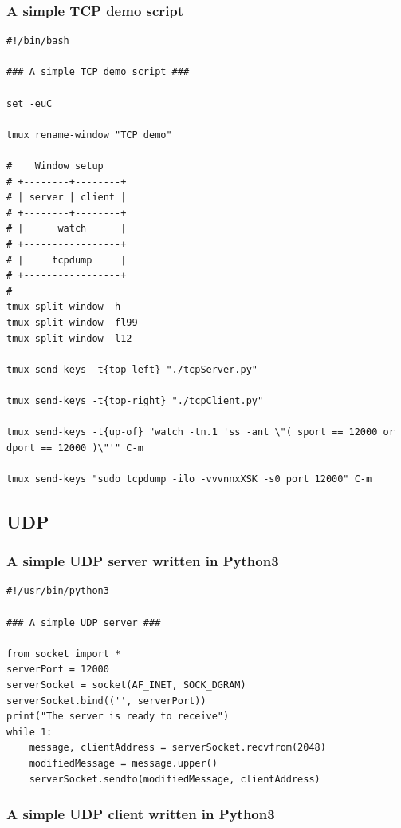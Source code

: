 \documentclass{article}
\begin{document}
\subsubsection{A simple TCP demo script}
\label{sec:orgdf1e2a5}

\begin{verbatim}
#!/bin/bash

### A simple TCP demo script ###

set -euC

tmux rename-window "TCP demo"

#    Window setup
# +--------+--------+
# | server | client |
# +--------+--------+
# |      watch      |
# +-----------------+
# |     tcpdump     |
# +-----------------+
#
tmux split-window -h
tmux split-window -fl99
tmux split-window -l12

tmux send-keys -t{top-left} "./tcpServer.py" 

tmux send-keys -t{top-right} "./tcpClient.py"

tmux send-keys -t{up-of} "watch -tn.1 'ss -ant \"( sport == 12000 or dport == 12000 )\"'" C-m

tmux send-keys "sudo tcpdump -ilo -vvvnnxXSK -s0 port 12000" C-m
\end{verbatim}
\subsection{UDP}
\label{sec:orga5eac96}

\subsubsection{A simple UDP server written in Python3}
\label{sec:org02299d9}

\begin{verbatim}
#!/usr/bin/python3

### A simple UDP server ###

from socket import *
serverPort = 12000
serverSocket = socket(AF_INET, SOCK_DGRAM)
serverSocket.bind(('', serverPort))
print("The server is ready to receive")
while 1:
    message, clientAddress = serverSocket.recvfrom(2048)
    modifiedMessage = message.upper()
    serverSocket.sendto(modifiedMessage, clientAddress)
\end{verbatim}
\subsubsection{A simple UDP client written in Python3}
\label{sec:org8814dbd}
\end{document}
